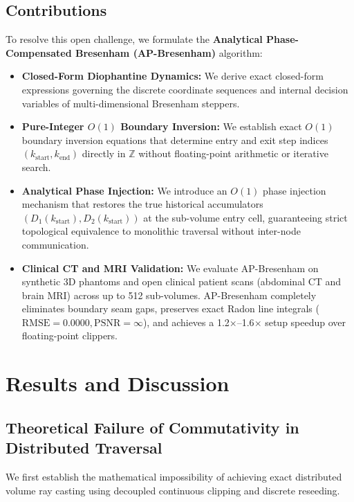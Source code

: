 \documentclass[journal=dme,manuscript=article,11pt]{article}
\begin{document}
\subsection{Contributions}
To resolve this open challenge, we formulate the \textbf{Analytical Phase-Compensated Bresenham (AP-Bresenham)} algorithm:
\begin{itemize}
    \item \textbf{Closed-Form Diophantine Dynamics:} We derive exact closed-form expressions governing the discrete coordinate sequences and internal decision variables of multi-dimensional Bresenham steppers.
    \item \textbf{Pure-Integer $O(1)$ Boundary Inversion:} We establish exact $O(1)$ boundary inversion equations that determine entry and exit step indices $(k_{\mathrm{start}}, k_{\mathrm{end}})$ directly in $\mathbb{Z}$ without floating-point arithmetic or iterative search.
    \item \textbf{Analytical Phase Injection:} We introduce an $O(1)$ phase injection mechanism that restores the true historical accumulators $(D_1(k_{\mathrm{start}}), D_2(k_{\mathrm{start}}))$ at the sub-volume entry cell, guaranteeing strict topological equivalence to monolithic traversal without inter-node communication.
    \item \textbf{Clinical CT and MRI Validation:} We evaluate AP-Bresenham on synthetic 3D phantoms and open clinical patient scans (abdominal CT and brain MRI) across up to 512 sub-volumes. AP-Bresenham completely eliminates boundary seam gaps, preserves exact Radon line integrals ($\mathrm{RMSE} = 0.0000, \mathrm{PSNR} = \infty$), and achieves a 1.2$\times$--1.6$\times$ setup speedup over floating-point clippers.
\end{itemize}

\section{Results and Discussion}
\label{sec:results}

\subsection{Theoretical Failure of Commutativity in Distributed Traversal}
We first establish the mathematical impossibility of achieving exact distributed volume ray casting using decoupled continuous clipping and discrete reseeding.
\end{document}

